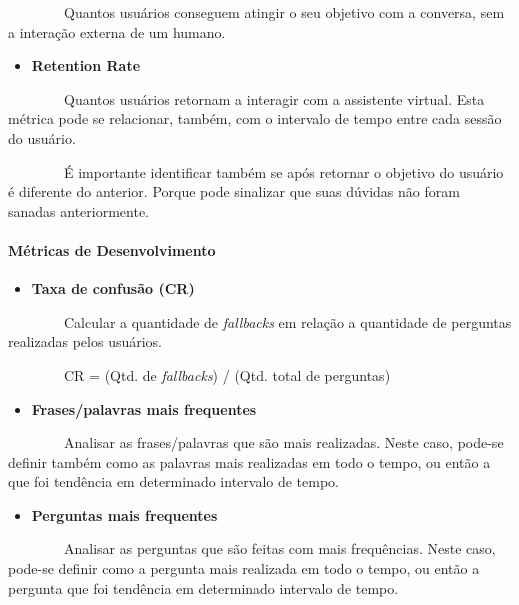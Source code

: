     Quantos usuários conseguem atingir o seu objetivo com a conversa,
sem a interação externa de um humano.

\begin{itemize}
\tightlist
\item
  \textbf{Retention Rate}
\end{itemize}

    Quantos usuários retornam a interagir com a assistente virtual. Esta
métrica pode se relacionar, também, com o intervalo de tempo entre cada
sessão do usuário.

    É importante identificar também se após retornar o objetivo do
usuário é diferente do anterior. Porque pode sinalizar que suas dúvidas
não foram sanadas anteriormente.

\hypertarget{muxe9tricas-de-desenvolvimento}{%
\paragraph{Métricas de
Desenvolvimento}\label{muxe9tricas-de-desenvolvimento}}

\begin{itemize}
\tightlist
\item
  \textbf{Taxa de confusão (CR)}
\end{itemize}

    Calcular a quantidade de \emph{fallbacks} em relação a quantidade de
perguntas realizadas pelos usuários.

    CR = (Qtd. de \emph{fallbacks}) / (Qtd. total de perguntas)

\begin{itemize}
\tightlist
\item
  \textbf{Frases/palavras mais frequentes}
\end{itemize}

    Analisar as frases/palavras que são mais realizadas. Neste caso,
pode-se definir também como as palavras mais realizadas em todo o tempo,
ou então a que foi tendência em determinado intervalo de tempo.

\begin{itemize}
\tightlist
\item
  \textbf{Perguntas mais frequentes}
\end{itemize}

    Analisar as perguntas que são feitas com mais frequências. Neste
caso, pode-se definir como a pergunta mais realizada em todo o tempo, ou
então a pergunta que foi tendência em determinado intervalo de tempo.

